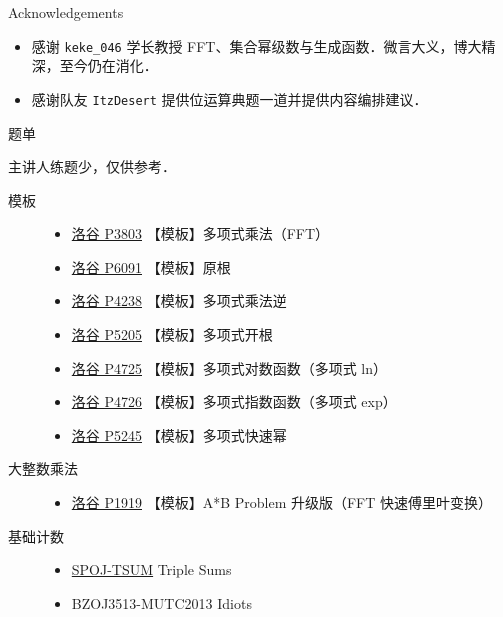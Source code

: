 \documentclass[fontset=fandol]{ctexbeamer}
\newcommand{\myemph}[1]{{\usebeamercolor[fg]{structure} #1}}
\begin{document}
\begin{frame}[fragile]{Acknowledgements}
\begin{itemize}
    \item 感谢 \verb|keke_046| 学长教授 FFT、集合幂级数与生成函数．微言大义，博大精深，至今仍在消化．
    \item 感谢队友 \verb|ItzDesert| 提供位运算典题一道并提供内容编排建议．
\end{itemize}
\end{frame}

\begin{frame}[allowframebreaks]{题单}

主讲人练题少，仅供参考．

\begin{description}
    \item[模板] \begin{itemize}
        \item \href{https://www.luogu.com.cn/problem/P3803}{洛谷 P3803} 【模板】多项式乘法（FFT）
        \item \href{https://www.luogu.com.cn/problem/P6091}{洛谷 P6091} 【模板】原根
        \item \href{https://www.luogu.com.cn/problem/P4238}{洛谷 P4238} 【模板】多项式乘法逆
        \item \href{https://www.luogu.com.cn/problem/P5205}{洛谷 P5205} 【模板】多项式开根
        \item \href{https://www.luogu.com.cn/problem/P4725}{洛谷 P4725} 【模板】多项式对数函数（多项式 ln）
        \item \href{https://www.luogu.com.cn/problem/P4726}{洛谷 P4726} 【模板】多项式指数函数（多项式 exp）
        \item \href{https://www.luogu.com.cn/problem/P5245}{洛谷 P5245} 【模板】多项式快速幂
    \end{itemize}
    \item[大整数乘法] \begin{itemize}
        \item \href{https://www.luogu.com.cn/problem/P1919}{洛谷 P1919} 【模板】A*B Problem 升级版（FFT 快速傅里叶变换） 
    \end{itemize}
    \item[基础计数] \begin{itemize}
        \item \href{https://www.spoj.com/problems/TSUM/}{SPOJ-TSUM} Triple Sums
        \item \myemph{BZOJ3513}-MUTC2013 Idiots


\end{itemize}
\end{description}
\end{frame}
\end{document}

